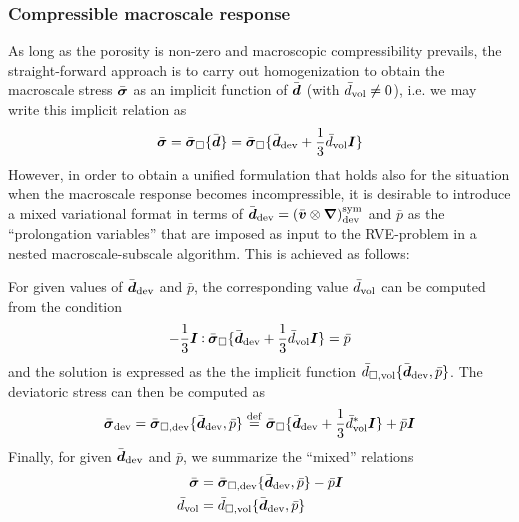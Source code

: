 \documentclass[10pt,a4paper]{article}
\begin{document}
\subsubsection{Compressible macroscale response}

As long as the porosity is non-zero and macroscopic compressibility prevails, the straight-forward approach is to carry out homogenization to obtain the macroscale stress $\bar{\boldsymbol{\sigma}}$ as an implicit function of $\bar{\boldsymbol{d}}$ (with $\bar{d}_{\mathrm{vol}}\neq 0$), i.e. we may write this implicit relation as
\begin{equation}
   \bar{\boldsymbol{\sigma}} = \bar{\boldsymbol{\sigma}}_\Box\{\bar{\boldsymbol{d}}\} = \bar{\boldsymbol{\sigma}}_\Box\{\bar{\boldsymbol{d}}_{\mathrm{dev}} +\frac13\bar{d}_{\mathrm{vol}}\boldsymbol{I}\}
\label{eq416a}
\end{equation}
However, in order to obtain a unified formulation that holds also for the situation when the macroscale response becomes incompressible, it is desirable to introduce a mixed variational format in terms of $\bar{\boldsymbol{d}}_{\mathrm{dev}}=\left(\bar{\boldsymbol{v}}\mathbin{\otimes}\boldsymbol{\nabla}\right)^{\mathrm{sym}}_{\mathrm{dev}}$ and $\bar{p}$ as the ``prolongation variables'' that are imposed as input to the RVE-problem in a nested macroscale-subscale algorithm. This is achieved as follows:

For given values of $\bar{\boldsymbol{d}}_{\mathrm{dev}}$ and $\bar{p}$, the corresponding value $\bar{d}_{\mathrm{vol}}$ can be computed from the condition
\begin{equation}
    -\frac13 \boldsymbol{I}\mathbin{\vcentcolon} \bar{\boldsymbol{\sigma}}_\Box\{\bar{\boldsymbol{d}}_{\mathrm{dev}} +\frac13\bar{d}_{\mathrm{vol}}\boldsymbol{I}\} = \bar p
\label{eq416}
\end{equation}
and the solution is expressed as the the implicit function $\bar{d}_{\Box,\mathrm{vol}}\{\bar{\boldsymbol{d}}_{\mathrm{dev}},\bar{p}\}$. The deviatoric stress can then be computed as
\begin{equation}
    \bar{\boldsymbol{\sigma}}_{\mathrm{dev}} = \bar{\boldsymbol{\sigma}}_{\Box,\mathrm{dev}}\{\bar{\boldsymbol{d}}_{\mathrm{dev}},\bar p\} \overset{\mathrm{def}}{=} \bar{\boldsymbol{\sigma}}_\Box\{\bar{\boldsymbol{d}}_{\mathrm{dev}} + \frac13 \bar{d}_{\mathrm{vol}}^*\boldsymbol{I}\} + \bar{p}\boldsymbol{I}
\label{eq418}
\end{equation}
Finally, for given $\bar{\boldsymbol{d}}_{\mathrm{dev}}$ and $\bar{p}$, we summarize the ``mixed'' relations
\begin{align}
 \bar{\boldsymbol{\sigma}} & =  \bar{\boldsymbol{\sigma}}_{\Box,\mathrm{dev}}\{\bar{\boldsymbol{d}}_{\mathrm{dev}},\bar p\} - \bar p\boldsymbol{I}
\label{eq418a}\\
 \bar{d}_{\mathrm{vol}} & =  \bar{d}_{\Box,\mathrm{vol}}\{\bar{\boldsymbol{d}}_{\mathrm{dev}}, \bar p\}
\label{eq418b}
\end{align}
\end{document}
